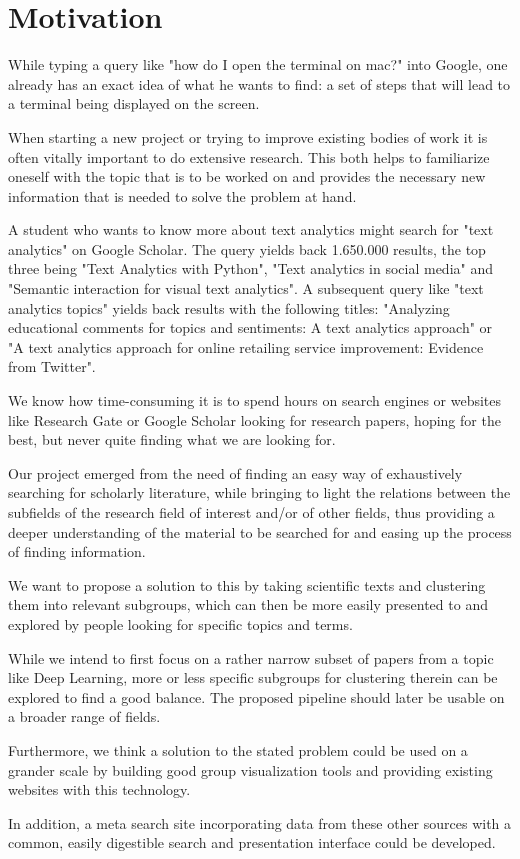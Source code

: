 \section{Motivation}

While typing a query like "how do I open the terminal on mac?" into Google, one already has an exact idea of what he wants to find: a set of steps that will lead to a terminal being displayed on the screen.

When starting a new project or trying to improve existing bodies of work it is often vitally important to do extensive research. This both helps to familiarize oneself with the topic that is to be worked on and provides the necessary new information that is needed to solve the problem at hand.

A student who wants to know more about text analytics might search for "text analytics" on Google Scholar. The query yields back 1.650.000 results, the top three being "Text Analytics with Python", "Text analytics in social media" and "Semantic interaction for visual text analytics". A subsequent query like "text analytics topics" yields back results with the following titles: "Analyzing educational comments for topics and sentiments: A text analytics approach" or "A text analytics approach for online retailing service improvement: Evidence from Twitter".

We know how time-consuming it is to spend hours on search engines or websites like Research Gate or Google Scholar looking for research papers, hoping for the best, but never quite finding what we are looking for.

Our project emerged from the need of finding an easy way of exhaustively searching for scholarly literature, while bringing to light the relations between the subfields of the research field of interest and/or of other fields, thus providing a deeper understanding of the material to be searched for and easing up the process of finding information.

We want to propose a solution to this by taking scientific texts and clustering them into relevant subgroups, which can then be more easily presented to and explored by people looking for specific topics and terms.

While we intend to first focus on a rather narrow subset of papers from a topic like Deep Learning, more or less specific subgroups for clustering therein can be explored to find a good balance. The proposed pipeline should later be usable on a broader range of fields.

Furthermore, we think a solution to the stated problem could be used on a grander scale by building good group visualization tools and providing existing websites with this technology.

In addition, a meta search site incorporating data from these other sources with a common, easily digestible search and presentation interface could be developed.